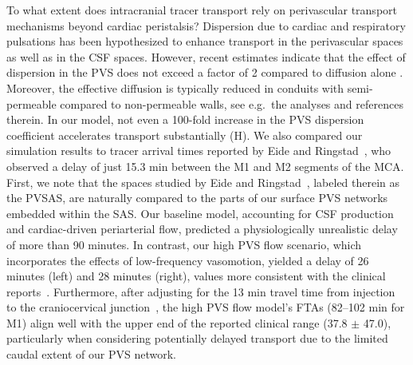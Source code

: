 \documentclass[fleqn,10pt]{wlscirep}
\begin{document}
To what extent does intracranial tracer transport rely on perivascular
transport mechanisms beyond cardiac peristalsis? Dispersion due to
cardiac and respiratory pulsations has been hypothesized to enhance
transport in the perivascular spaces as well as in the CSF
spaces. However, recent estimates indicate that the effect of
dispersion in the PVS does not exceed a factor of 2 compared to
diffusion alone
\cite{asgari2016glymphatic,sharp2019dispersion,bojarskaite2023sleep,troyetsky2021dispersion}.
Moreover, the effective diffusion is typically reduced in conduits
with semi-permeable compared to non-permeable walls, see e.g.~the
analyses\cite{decuzzi2006effective, dejam2021role} and references
therein. In our model, not even a 100-fold increase in the PVS
dispersion coefficient accelerates transport substantially
(H). We also compared our simulation results to
tracer arrival times reported by Eide and
Ringstad~\cite{eide2024functional}, who observed a delay of just 15.3
min between the M1 and M2 segments of the MCA. First, we note that the
spaces studied by Eide and Ringstad~\cite{eide2024functional}, labeled
therein as the PVSAS, are naturally compared to the parts of our
surface PVS networks embedded within the SAS. Our baseline model,
accounting for CSF production and cardiac-driven periarterial flow,
predicted a physiologically unrealistic delay of more than 90
minutes. In contrast, our high PVS flow scenario, which incorporates
the effects of low-frequency vasomotion, yielded a delay of 26 minutes
(left) and 28 minutes (right), values more consistent with the
clinical reports~\cite{eide2024functional}. Furthermore, after
adjusting for the 13 min travel time from injection to the
craniocervical junction~\cite{eide2024functional}, the high PVS flow
model's FTAs (82--102 min for M1) align well with the upper end of
the reported clinical range (37.8 $\pm$ 47.0), particularly when
considering potentially delayed transport due to the limited caudal
extent of our PVS network.
\end{document}
